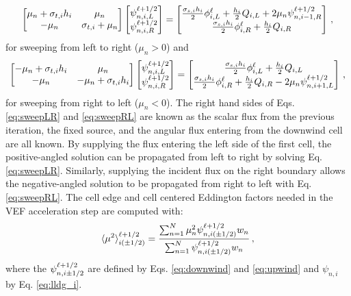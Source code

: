 	\begin{equation} \label{eq:sweepLR}
		\left[\begin{matrix}
			\mu_n + \sigma_{t,i} h_i & \mu_n  \\ 
			-\mu_n & \sigma_{t,i} + \mu_n \\ 
		\end{matrix}\right]
		\left[\begin{matrix}
			\psi_{n,i,L}^{\ell+1/2} \\ \psi_{n,i,R}^{\ell+1/2}
		\end{matrix}\right]
		= \left[\begin{matrix}
			\frac{\sigma_{s,i}h_i}{2} \phi_{i,L}^\ell + \frac{h_i}{2} Q_{i,L} + 2\mu_n \psi_{n,i-1,R}^{\ell+1/2} \\
			\frac{\sigma_{s,i}h_i}{2} \phi_{i,R}^\ell + \frac{h_i}{2} Q_{i,R} 
		\end{matrix}\right] \,, 
	\end{equation}
for sweeping from left to right ($\mu_n > 0$) and 
	\begin{equation} \label{eq:sweepRL}
		\left[\begin{matrix} 
			-\mu_n + \sigma_{t,i}h_i & \mu_n \\ 
			-\mu_n & -\mu_n + \sigma_{t,i}h_i \\ 
		\end{matrix} \right]
		\left[\begin{matrix}
			\psi_{n,i,L}^{\ell+1/2} \\ \psi_{n,i,R}^{\ell+1/2}
		\end{matrix} \right]
		= \left[\begin{matrix}
			\frac{\sigma_{s,i}h_i}{2} \phi_{i,L}^\ell + \frac{h_i}{2} Q_{i,L} \\ 
			\frac{\sigma_{s,i}h_i}{2} \phi_{i,R}^\ell + \frac{h_i}{2} Q_{i,R} - 2\mu_n \psi_{n,i+1,L}^{\ell+1/2}
		\end{matrix} \right]
		\,, 
	\end{equation}
for sweeping from right to left ($\mu_n < 0$). The right hand sides of Eqs. \ref{eq:sweepLR} and \ref{eq:sweepRL} are known as the scalar flux from the previous iteration, the fixed source, and the angular flux entering from the downwind cell are all known. By supplying the flux entering the left side of the first cell, the positive-angled solution can be propagated from left to right by solving Eq. \ref{eq:sweepLR}. Similarly, supplying the incident flux on the right boundary allows the negative-angled solution to be propagated from right to left with Eq. \ref{eq:sweepRL}. The cell edge and cell centered Eddington factors needed in the VEF acceleration step are computed with: 
	\begin{equation} \label{lldg:edd}
		\langle \mu^2 \rangle_{i(\pm1/2)}^{\ell+1/2} = \frac{
			\sum_{n=1}^N \mu_n^2 \psi_{n,i(\pm1/2)}^{\ell+1/2} w_n
		}{
			\sum_{n=1}^N \psi_{n,i(\pm1/2)}^{\ell+1/2} w_n 
		} \,,
	\end{equation}
where the $\psi_{n,i\pm1/2}^{\ell+1/2}$ are defined by Eqs. \ref{eq:downwind} and \ref{eq:upwind} and $\psi_{n,i}$ by Eq. \ref{eq:lldg_i}. 